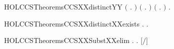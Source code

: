 \begin{SaveVerbatim}{HOLCCSTheoremsCCSXXdistinctYY}
   \ensuremath{(}\HOLSymConst{\HOLTokenForall{}}   .    \HOLSymConst{\HOLTokenNotEqual{}}  \HOLSymConst{\ensuremath{\mid}} \ensuremath{)} \HOLSymConst{\HOLTokenConj{}}
   \ensuremath{(}\HOLSymConst{\HOLTokenForall{}}   .    \HOLSymConst{\HOLTokenNotEqual{}}   \ensuremath{)} \HOLSymConst{\HOLTokenConj{}}
   \ensuremath{(}\HOLSymConst{\HOLTokenForall{}}   .    \HOLSymConst{\HOLTokenNotEqual{}}   \ensuremath{)} \HOLSymConst{\HOLTokenConj{}}
   \HOLSymConst{\HOLTokenForall{}}   .    \HOLSymConst{\HOLTokenNotEqual{}}   
\end{SaveVerbatim}
\newcommand{\HOLCCSTheoremsCCSXXdistinctYY}{\UseVerbatim{HOLCCSTheoremsCCSXXdistinctYY}}
\begin{SaveVerbatim}{HOLCCSTheoremsCCSXXdistinctXXexists}
\HOLTokenTurnstile{} \HOLSymConst{\HOLTokenForall{}}. \HOLSymConst{\HOLTokenExists{}}.  \HOLSymConst{\HOLTokenNotEqual{}} 
\end{SaveVerbatim}
\newcommand{\HOLCCSTheoremsCCSXXdistinctXXexists}{\UseVerbatim{HOLCCSTheoremsCCSXXdistinctXXexists}}
\begin{SaveVerbatim}{HOLCCSTheoremsCCSXXSubstXXelim}
\HOLTokenTurnstile{} \HOLSymConst{\HOLTokenForall{}} .  \HOLConst{\HOLTokenNotIn{}}   \HOLSymConst{\HOLTokenImp{}} \HOLSymConst{\HOLTokenForall{}}. \ensuremath{[}\ensuremath{/}\ensuremath{]}  \HOLSymConst{\ensuremath{=}} 
\end{SaveVerbatim}
